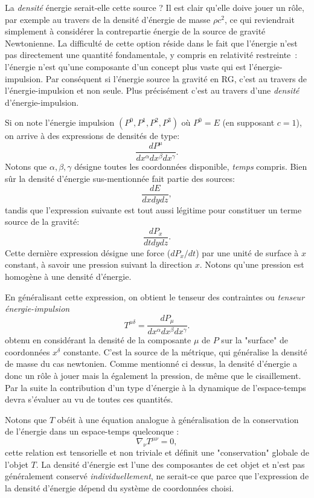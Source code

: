 La \textit{densité} énergie serait-elle cette source ? Il est clair qu'elle doive jouer un rôle, par exemple au travers de la densité d'énergie de masse $\rho c^2$, ce qui reviendrait simplement à considérer la contrepartie énergie de la source de gravité Newtonienne. La difficulté de cette option réside dans le fait que l'énergie n'est pas directement une quantité fondamentale, y compris en relativité restreinte~: l'énergie n'est qu'une composante d'un concept plus vaste qui est l'énergie-impulsion. Par conséquent si l'énergie source la gravité en RG, c'est au travers de l'énergie-impulsion et non seule. Plus précisément c'est au travers d'une \textit{densité} d'énergie-impulsion.

Si on note l'énergie impulsion $(P^0,P^1,P^2,P^3)$ où $P^0=E$ (en supposant $c=1$), on arrive à des expressions de densités de type:
\begin{equation}
\frac{dP^\mu}{dx^\alpha dx^\beta dx^\gamma}.
\end{equation}
Notons que $\alpha,\beta,\gamma$ désigne toutes les coordonnées disponible, \textit{temps} compris. Bien sûr la densité d'énergie sus-mentionnée fait partie des sources:
\begin{equation}
\frac{dE}{dx dy dz},
\end{equation}
tandis que l'expression suivante est tout aussi légitime pour constituer un terme source de la gravité:
\begin{equation}
\frac{dP_x}{dtdydz}.
\end{equation}
Cette dernière expression désigne une force ($dP_x/dt$) par une unité de surface à $x$ constant, à savoir une pression suivant la direction $x$. Notons qu'une pression est homogène à une densité d'énergie.

En généralisant cette expression, on obtient le tenseur des contraintes ou \textit{tenseur énergie-impulsion}
\begin{equation}
T^{\mu\delta} = \frac{dP_\mu}{dx^\alpha dx^\beta dx^\gamma}.
\end{equation}
obtenu en considérant la densité de la composante $\mu$ de $P$ sur la "surface" de coordonnées $x^\delta$ constante. C'est la source de la métrique, qui généralise la densité de masse du cas newtonien.  Comme mentionné ci dessus, la densité d'énergie a donc un rôle à jouer mais la également la pression, de même que le cisaillement. Par la suite la contribution d'un type d'énergie à la dynamique de l'espace-temps devra s'évaluer au vu de toutes ces quantités. 

Notons que $T$ obéit à une équation analogue à généralisation de la conservation de l'énergie dans un espace-temps quelconque : 
 \begin{equation}
 \nabla_\nu T^{\mu\nu}=0,
 \label{e:divT}
 \end{equation}
 cette relation est tensorielle et non triviale et définit une "conservation" globale de l'objet $T$. La densité d'énergie est l'une des composantes de cet objet et n'est pas généralement conservé \textit{individuellement}, ne serait-ce que parce que l'expression de la densité d'énergie dépend du système de coordonnées choisi.

